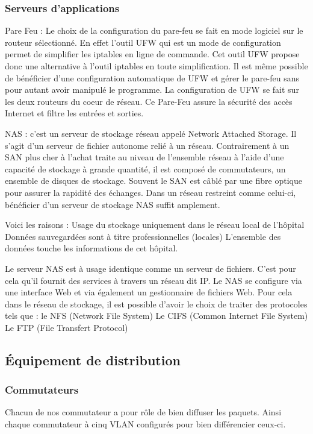 %
\clearpage
\subsubsection{Serveurs d'applications}

Pare Feu :
Le choix de la configuration du pare-feu se fait en mode logiciel sur le routeur sélectionné.
En effet l'outil UFW qui est un mode de configuration permet de simplifier les iptables en ligne de commande.
Cet outil UFW propose donc une alternative à l'outil iptables en toute simplification.
Il est même possible de bénéficier d'une configuration automatique de UFW et gérer le pare-feu sans pour autant avoir manipulé le programme.
La configuration de UFW se fait sur les deux routeurs du coeur de réseau. Ce Pare-Feu assure la sécurité des accès Internet et filtre les entrées et sorties.

NAS :
c'est un serveur de stockage réseau appelé Network Attached Storage. Il s'agit d'un serveur de fichier autonome relié à un réseau. Contrairement à un SAN plus cher à l'achat traite au niveau de l'ensemble réseau à l'aide d'une capacité de stockage à grande quantité, il est  composé de commutateurs, un ensemble  de disques de stockage. Souvent le SAN est câblé par une fibre optique pour assurer la rapidité des échanges.
Dans un réseau restreint comme celui-ci, bénéficier d'un serveur de stockage NAS suffit amplement.

Voici les raisons :
Usage du stockage uniquement dans le réseau local de l'hôpital
Données sauvegardées sont à titre professionnelles (locales)
L'ensemble des données touche les informations de cet hôpital.

Le serveur NAS est à usage identique comme un serveur de fichiers. C'est pour cela qu'il fournit des services à travers un réseau dit IP.  Le NAS se configure via une interface Web  et via également un gestionnaire de fichiers Web.
Pour cela dans le réseau de stockage, il est possible d'avoir le choix de traiter des protocoles tels que :
le NFS (Network File System)
Le CIFS (Common Internet File System)
Le FTP (File Transfert Protocol)


%
%
\clearpage
\subsection{Équipement de distribution}

%
\subsubsection{Commutateurs}
Chacun de nos commutateur a pour rôle de bien diffuser les paquets. Ainsi chaque commutateur à cinq VLAN configurés pour bien différencier ceux-ci.

